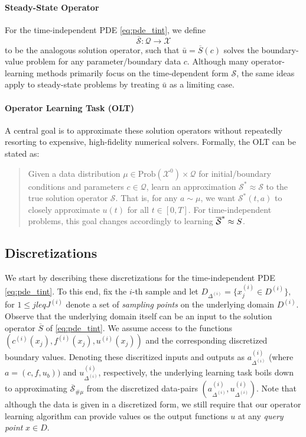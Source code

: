 \documentclass[reqno,10pt]{amsart}
\theoremstyle{plain}
\theoremstyle{definition}
\newcommand{\cal}[1]{\mathcal{#1}}
\begin{document}
\paragraph{\bf Steady-State Operator} For the time-independent PDE \ref{eq:pde_tint}, we define
\begin{equation}
    \overline{\cal S} : \cal Q \to \cal X
\end{equation}
to be the analogous solution operator, such that $\bar{u} = \overline{S}(c)$ solves the boundary-value problem for any parameter/boundary data $c$. Although many operator-learning methods primarily focus on the time-dependent form $\cal S$, the same ideas apply to steady-state problems by treating $\bar{u}$ as a limiting case.

\paragraph{\bf Operator Learning Task (OLT)} A central goal is to approximate these solution operators without repeatedly resorting to expensive, high-fidelity numerical solvers. Formally, the OLT can be stated as:
\begin{quote}
    Given a data distribution $\mu \in \text{Prob}(\cal X^0) \times \cal Q$ for initial/boundary conditions and parameters $c\in \cal Q$, learn an approximation $\cal S^{*} \approx \cal S$ to the true solution operator $\cal S$. That is, for any $a \sim \mu$, we want $\cal S^{*}(t,a)$ to closely approximate $u(t)$ for all $t \in [0,T]$. For time-independent problems, this goal changes accordingly to learning $\overline{\cal S}^{*} \approx \cal \overline{S}$.    
\end{quote}
\subsection{\bf Discretizations}
We start by describing these discretizations for the time-independent PDE \ref{eq:pde_tint}. To this end, fix the $i$-th sample and let $D_{\Delta^{(i)}} = \{x_j^{(i)} \in D^{(i)}\},$ for $ 1\leq j leq J^{(i)}$ denote a set of {\it sampling points} on the underlying domain $D^{(i)}$. Observe that the underlying domain itself can be an input to the solution operator $\overline{S}$ of \ref{eq:pde_tint}. We assume access to the functions $(c^{(i)}(x_j), f^{(i)}(x_j), u^{(i)}(x_j))$ and the corresponding discretized boundary values. Denoting these discritized inputs and outputs as $a^{(i)}_{\Delta^{(i)}}$ (where $a= (c,f,u_b))$ and $u^{(i)}_{\Delta^{(i)}}$, respectively, the underlying learning task boils down to approximating $\overline{\cal S}_{\#\mu}$ from the discretized data-pairs $\left(a^{(i)}_{\Delta^{(i)}}, u^{(i)}_{\Delta^{(i)}}\right).$ Note that although the data is given in a discretized form, we still require that our operator learning algorithm can provide values os the output functions $u$ at any {\it query point} $x\in D$.
\end{document}
